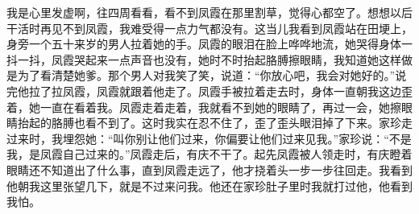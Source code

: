 \documentclass[12pt,UTF8]{ctexbook}
\begin{document}
我是心里发虚啊，往四周看看，看不到凤霞在那里割草，觉得心都空了。想想以后干活时再见不到凤霞，我难受得一点力气都没有。这当儿我看到凤霞站在田埂上，身旁一个五十来岁的男人拉着她的手。凤霞的眼泪在脸上哗哗地流，她哭得身体一抖一抖，凤霞哭起来一点声音也没有，她时不时抬起胳膊擦眼睛，我知道她这样做是为了看清楚她爹。那个男人对我笑了笑，说道：“你放心吧，我会对她好的。”说完他拉了拉凤霞，凤霞就跟着他走了。凤霞手被拉着走去时，身体一直朝我这边歪着，她一直在看着我。凤霞走着走着，我就看不到她的眼睛了，再过一会，她擦眼睛抬起的胳膊也看不到了。这时我实在忍不住了，歪了歪头眼泪掉了下来。家珍走过来时，我埋怨她：“叫你别让他们过来，你偏要让他们过来见我。”家珍说：“不是我，是凤霞自己过来的。”凤霞走后，有庆不干了。起先凤霞被人领走时，有庆瞪着眼睛还不知道出了什么事，直到凤霞走远了，他才挠着头一步一步往回走。我看到他朝我这里张望几下，就是不过来问我。他还在家珍肚子里时我就打过他，他看到我怕。
\end{document}
